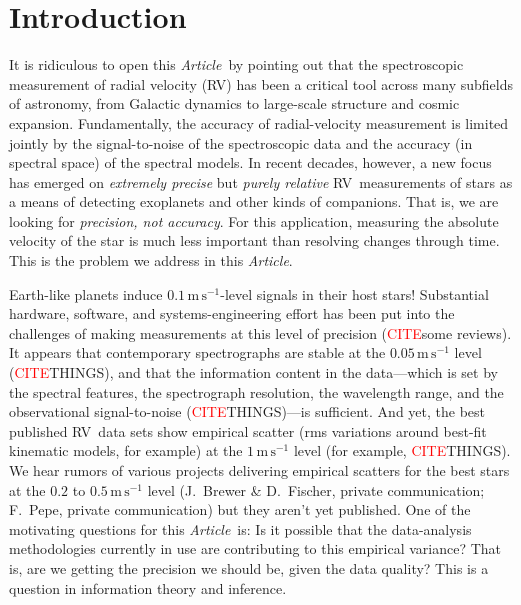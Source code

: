 \documentclass[modern]{aastex631}
\newcommand{\unit}[1]{\mathrm{#1}}
\newcommand{\m}{\unit{m}}
\newcommand{\s}{\unit{s}}
\newcommand{\mps}{\m\,\s^{-1}}
\newcommand{\documentname}{\textsl{Article}}
\newcommand{\todo}[1]{\textcolor{red}{#1}}  %
\newcommand{\CITE}{\todo{CITE}}
\newcommand{\acronym}[1]{{\small{#1}}}
\newcommand{\RV}{\acronym{RV}}
\begin{document}

\section*{}
\clearpage
\section{Introduction}

It is ridiculous to open this \documentname\ by pointing out that
the spectroscopic measurement of radial velocity (\RV) has been a
critical tool across many subfields of astronomy, from Galactic
dynamics to large-scale structure and cosmic expansion.
Fundamentally, the accuracy of radial-velocity measurement is limited
jointly by the signal-to-noise of the spectroscopic data and
the accuracy (in spectral space) of the spectral models.
In recent decades, however, a new focus has emerged on \emph{extremely
  precise} but \emph{purely relative} \RV\ measurements of stars as a
means of detecting exoplanets and other kinds of companions.
That is, we are looking for \emph{precision, not accuracy}.
For this application, measuring the absolute velocity of the star is
much less important than resolving changes through time.
This is the problem we address in this \documentname.

Earth-like planets induce $0.1\,\mps$-level signals in their host
stars!
Substantial hardware, software, and systems-engineering effort has
been put into the challenges of making measurements at this level of
precision (\CITE some reviews).
It appears that contemporary spectrographs are stable at the
$0.05\,\mps$ level (\CITE THINGS), and that the information content in
the data---which is set by the spectral features, the spectrograph
resolution, the wavelength range, and the observational
signal-to-noise (\CITE THINGS)---is sufficient.
And yet, the best published \RV\ data sets show empirical scatter
(rms variations around best-fit kinematic models, for example) at the
$1\,\mps$ level (for example, \CITE THINGS).
We hear rumors of various projects delivering empirical scatters for
the best stars at the $0.2$ to $0.5\,\mps$ level
(J.~Brewer \& D.~Fischer, private communication; F.~Pepe, private communication)
but they aren't yet published.
One of the motivating questions for this \documentname\ is: Is it possible that
the data-analysis methodologies currently in use are contributing to this
empirical variance?
That is, are we getting the precision we should be, given the data
quality?
This is a question in information theory and inference.
\end{document}
